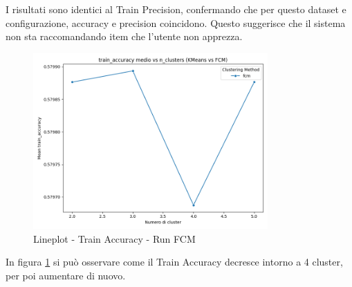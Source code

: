 I risultati sono identici al Train Precision, confermando che per questo dataset e configurazione, accuracy e precision coincidono. Questo suggerisce che il sistema non sta raccomandando item che l'utente non apprezza.

\begin{figure}[H]
  \centering
  \includegraphics[width=0.8\textwidth]{../output/run_fcm/images/train/accuracy/lineplot_nclusters_train_accuracy.png}
  \caption{Lineplot - Train Accuracy - Run FCM}
  \label{fig:train_accuracy_fcm}
\end{figure}

In figura \ref{fig:train_accuracy_fcm} si può osservare come il Train Accuracy decresce intorno a 4 cluster, per poi aumentare di nuovo.

\begin{table}[H]
  \centering
  \caption{Top 5 Configurazioni per Train F1-Score - Run FCM}
\end{table}

